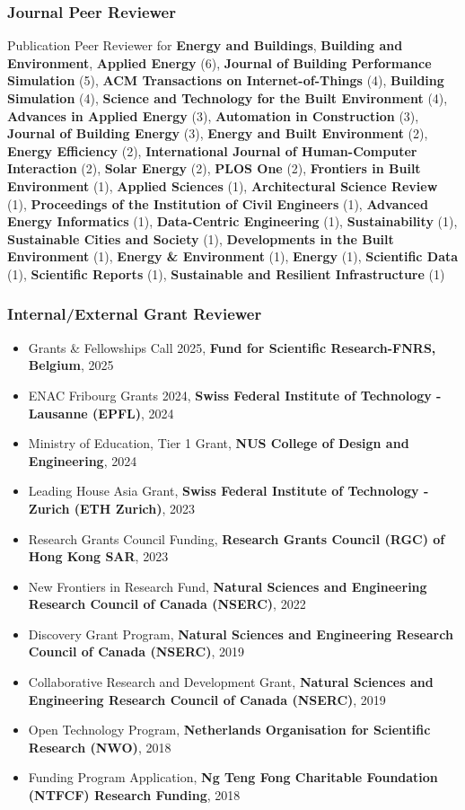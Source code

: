 \documentclass[10pt,a4paper]{article}
\begin{document}
\begin{small}
\subsubsection*{Journal Peer Reviewer}
Publication Peer Reviewer for \textbf{Energy and Buildings}, \textbf{Building and Environment}, \textbf{Applied Energy} (6), \textbf{Journal of Building Performance Simulation} (5), \textbf{ACM Transactions on Internet-of-Things} (4), \textbf{Building Simulation} (4),  \textbf{Science and Technology for the Built Environment} (4), \textbf{Advances in Applied Energy} (3), \textbf{Automation in Construction} (3), \textbf{Journal of Building Energy} (3), \textbf{Energy and Built Environment} (2), \textbf{Energy Efficiency} (2), \textbf{International Journal of Human-Computer Interaction} (2), \textbf{Solar Energy} (2), \textbf{PLOS One} (2), \textbf{Frontiers in Built Environment} (1), \textbf{Applied Sciences} (1), \textbf{Architectural Science Review} (1), \textbf{Proceedings of the Institution of Civil Engineers} (1), \textbf{Advanced Energy Informatics} (1), \textbf{Data-Centric Engineering} (1), \textbf{Sustainability} (1), \textbf{Sustainable Cities and Society} (1), \textbf{Developments in the Built Environment} (1), \textbf{Energy \& Environment} (1), \textbf{Energy} (1), \textbf{Scientific Data} (1), \textbf{Scientific Reports} (1), \textbf{Sustainable and Resilient Infrastructure} (1)

\subsubsection*{Internal/External Grant Reviewer}
\begin{itemize}
\item
Grants \& Fellowships Call 2025, \textbf{Fund for Scientific Research-FNRS, Belgium}, 2025
\item
ENAC Fribourg Grants 2024, \textbf{Swiss Federal Institute of Technology - Lausanne (EPFL)}, 2024
\item
Ministry of Education, Tier 1 Grant, \textbf{NUS College of Design and Engineering}, 2024
\item
Leading House Asia Grant, \textbf{Swiss Federal Institute of Technology - Zurich (ETH Zurich)}, 2023
\item
Research Grants Council Funding, \textbf{Research Grants Council (RGC) of Hong Kong SAR}, 2023
\item
New Frontiers in Research Fund, \textbf{Natural Sciences and Engineering Research Council of Canada (NSERC)}, 2022
\item
Discovery Grant Program, \textbf{Natural Sciences and Engineering Research Council of Canada (NSERC)}, 2019
\item
Collaborative Research and Development Grant, \textbf{Natural Sciences and Engineering Research Council of Canada (NSERC)}, 2019
\item
Open Technology Program, \textbf{Netherlands Organisation for Scientific Research (NWO)}, 2018
\item
Funding Program Application, \textbf{Ng Teng Fong Charitable Foundation (NTFCF) Research Funding}, 2018
\end{itemize}



\end{small}
\end{document}

